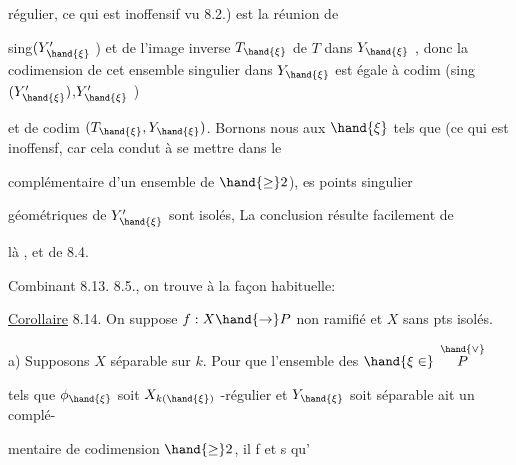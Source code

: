 régulier, ce qui est inoffensif vu 8.2.) est la réunion de

sing$(Y'_{\hand{\xi}}$ ) et de l'image inverse $T_{\hand{\xi}}$ de $T$ dans $Y_{\hand{\xi}}$ , donc la codimension
de cet ensemble singulier dans $Y_{\hand{\xi}}$ est égale à  codim (sing$(Y'_{\hand{\xi}})$,$Y'_{\hand{\xi}}$ )

et de codim $(T_{\hand{\xi}},Y_{\hand{\xi}})$. Bornons nous aux $\hand{\xi}$ tels que \hand{)}
\margin{$*$} 
(ce qui est inoffensf, car  cela condut à se mettre dans le

complémentaire d'un ensemble de  $\hand{\geq} 2$), es points singulier

géométriques de $Y'_{\hand{\xi}}$ sont  isolés, La conclusion résulte facilement de

là , et de 8.4. 

Combinant 8.13.  8.5., on trouve à la façon habituelle:

\uline{Corollaire} 8.14. On suppose $f:X\hand{\rightarrow} P$ non ramifié et $X$ sans pts isolés.

 a) Supposons $X$ séparable sur $k$. Pour que l'ensemble  des $\hand{\xi \in}$ $\overset{\hand{\vee}}{P}$

tels que $\phi_{\hand{\xi}}$ soit $X_{k(\hand{\xi})}$ -régulier et $Y_{\hand{\xi}}$ soit séparable ait un complé-%

mentaire de codimension $\hand{\geq} 2$, il f et s qu'

